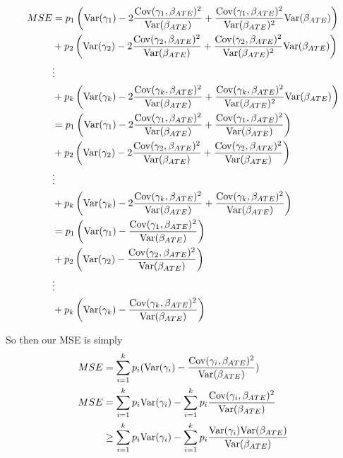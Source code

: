\begin{align*}
	MSE
	&=  p_1 \left(\mathrm{Var}(\gamma_1) - 2\frac{\mathrm{Cov}(\gamma_1, \beta_{ATE})^2}{\mathrm{Var}(\beta_{ATE})} + \frac{\mathrm{Cov}(\gamma_1, \beta_{ATE})^2}{\mathrm{Var}(\beta_{ATE})^2} \mathrm{Var}(\beta_{ATE}) \right) \\
	& + p_2 \left(\mathrm{Var}(\gamma_2) - 2\frac{\mathrm{Cov}(\gamma_2, \beta_{ATE})^2}{\mathrm{Var}(\beta_{ATE})} + \frac{\mathrm{Cov}(\gamma_2, \beta_{ATE})^2}{\mathrm{Var}(\beta_{ATE})^2} \mathrm{Var}(\beta_{ATE}) \right) \\
	&\vdots \\
	&+ p_k  \left(\mathrm{Var}(\gamma_k) - 2\frac{\mathrm{Cov}(\gamma_k, \beta_{ATE})^2}{\mathrm{Var}(\beta_{ATE})}+ \frac{\mathrm{Cov}(\gamma_k, \beta_{ATE})^2}{\mathrm{Var}(\beta_{ATE})^2} \mathrm{Var}(\beta_{ATE}) \right) \\
	&=  p_1 \left(\mathrm{Var}(\gamma_1) - 2\frac{\mathrm{Cov}(\gamma_1, \beta_{ATE})^2}{\mathrm{Var}(\beta_{ATE})} + \frac{\mathrm{Cov}(\gamma_1, \beta_{ATE})^2}{\mathrm{Var}(\beta_{ATE})}  \right) \\
	& + p_2 \left(\mathrm{Var}(\gamma_2) - 2\frac{\mathrm{Cov}(\gamma_2, \beta_{ATE})^2}{\mathrm{Var}(\beta_{ATE})} + \frac{\mathrm{Cov}(\gamma_2, \beta_{ATE})^2}{\mathrm{Var}(\beta_{ATE})} \right) \\
	&\vdots \\
	&+ p_k  \left(\mathrm{Var}(\gamma_k) - 2\frac{\mathrm{Cov}(\gamma_k, \beta_{ATE})^2}{\mathrm{Var}(\beta_{ATE})}+ \frac{\mathrm{Cov}(\gamma_k, \beta_{ATE})^2}{\mathrm{Var}(\beta_{ATE})}  \right) \\
	&=  p_1 \left(\mathrm{Var}(\gamma_1) - \frac{\mathrm{Cov}(\gamma_1, \beta_{ATE})^2}{\mathrm{Var}(\beta_{ATE})}  \right) \\
	& + p_2 \left(\mathrm{Var}(\gamma_2) - \frac{\mathrm{Cov}(\gamma_2, \beta_{ATE})^2}{\mathrm{Var}(\beta_{ATE})} \right) \\
	&\vdots \\
	&+ p_k  \left(\mathrm{Var}(\gamma_k) - \frac{\mathrm{Cov}(\gamma_k, \beta_{ATE})^2}{\mathrm{Var}(\beta_{ATE})} \right) \\
\end{align*}


So then our MSE is simply
\begin{align*}
	MSE &= \sum_{i=1}^{k} p_i (\mathrm{Var}(\gamma_i)  - \frac{\mathrm{Cov}(\gamma_i, \beta_{ATE})^2}{\mathrm{Var}(\beta_{ATE})})  \\
	MSE &= \sum_{i=1}^{k} p_i \mathrm{Var}(\gamma_i) 
	- \sum_{i=1}^{k} p_i \frac{\mathrm{Cov}(\gamma_i, \beta_{ATE})^2}{\mathrm{Var}(\beta_{ATE})} \\
		&\geq \sum_{i=1}^{k} p_i \mathrm{Var}(\gamma_i) 
	- \sum_{i=1}^{k} p_i \frac{\mathrm{Var}(\gamma_i)\mathrm{Var}( \beta_{ATE})}{\mathrm{Var}(\beta_{ATE})} \\
\end{align*} 

